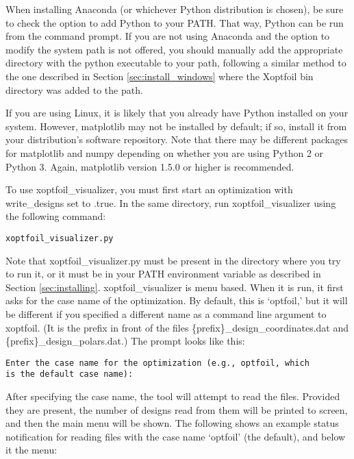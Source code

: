 \documentclass[11pt]{article}
\begin{document}
When installing Anaconda (or whichever Python distribution is chosen), be sure to check
the option to add Python to your PATH.  That way, Python can be run from the
command prompt.  If you are not using Anaconda and the option to modify the system path is
not offered, you should manually add the appropriate directory with the python executable
to your path, following a similar method to the one described in Section
\ref{sec:install_windows} where the Xoptfoil bin directory was added to the path.

If you are using Linux, it is likely that you already have Python installed on your
system.  However, matplotlib may not be installed by default; if so, install it from your
distribution's software repository.  Note that there may be different packages for 
matplotlib
and numpy depending on whether you are using Python 2 or Python 3. Again, matplotlib
version 1.5.0 or higher is recommended.

To use xoptfoil\_visualizer, you must first start an optimization with write\_designs set
to .true. In the same directory, run xoptfoil\_visualizer using the following command:

\begin{verbatim}
xoptfoil_visualizer.py
\end{verbatim}

Note that xoptfoil\_visualizer.py must be present in the directory where you try to run it,
or it must be in your PATH environment variable as described in Section
\ref{sec:installing}. xoptfoil\_visualizer is menu based.  When it is run, 
it first asks for the case name of the optimization.  By default, this is `optfoil,' but
it will be different if you specified a different name as a command line argument to
xoptfoil. (It is the prefix in front of the files 
\{prefix\}\_design\_coordinates.dat and
\{prefix\}\_design\_polars.dat.)  The prompt looks like this:

\begin{verbatim}
Enter the case name for the optimization (e.g., optfoil, which 
is the default case name): 
\end{verbatim}

After specifying the case name, the tool will attempt to read the files.  Provided they
are present, the number of designs read from them will be printed to screen, and then the
main menu will be shown.  The following shows an example status notification for reading
files with the case name `optfoil' (the default), and below it the menu:
\end{document}
